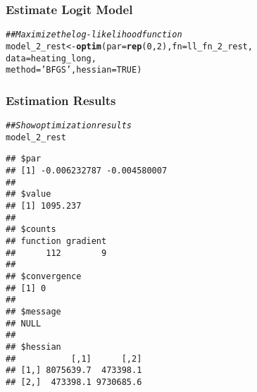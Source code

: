 \documentclass{beamer}\usepackage[]{graphicx}\usepackage[]{color}
\makeatletter
\newcommand{\hlnum}[1]{\textcolor[rgb]{0.686,0.059,0.569}{#1}}%
\newcommand{\hlstr}[1]{\textcolor[rgb]{0.192,0.494,0.8}{#1}}%
\newcommand{\hlcom}[1]{\textcolor[rgb]{0.678,0.584,0.686}{\textit{#1}}}%
\newcommand{\hlstd}[1]{\textcolor[rgb]{0.345,0.345,0.345}{#1}}%
\newcommand{\hlkwb}[1]{\textcolor[rgb]{0.69,0.353,0.396}{#1}}%
\newcommand{\hlkwc}[1]{\textcolor[rgb]{0.333,0.667,0.333}{#1}}%
\newcommand{\hlkwd}[1]{\textcolor[rgb]{0.737,0.353,0.396}{\textbf{#1}}}%
\newenvironment{kframe}{%
 \def\at@end@of@kframe{}%
 \ifinner\ifhmode%
  \def\at@end@of@kframe{\end{minipage}}%
  \begin{minipage}{\columnwidth}%
 \fi\fi%
 \def\FrameCommand##1{\hskip\@totalleftmargin \hskip-\fboxsep
 \colorbox{shadecolor}{##1}\hskip-\fboxsep
     \hskip-\linewidth \hskip-\@totalleftmargin \hskip\columnwidth}%
 \MakeFramed {\advance\hsize-\width
   \@totalleftmargin\z@ \linewidth\hsize
   \@setminipage}}%
 {\par\unskip\endMakeFramed%
 \at@end@of@kframe}
\newenvironment{knitrout}{}{} %
\makeatother
\begin{document}
\begin{frame}[fragile]\frametitle{Estimate Logit Model}
\begin{knitrout}\footnotesize
{}\color{fgcolor}\begin{kframe}
\begin{alltt}
\hlcom{## Maximize the log-likelihood function}
\hlstd{model_2_rest} \hlkwb{<-} \hlkwd{optim}\hlstd{(}\hlkwc{par} \hlstd{=} \hlkwd{rep}\hlstd{(}\hlnum{0}\hlstd{,} \hlnum{2}\hlstd{),} \hlkwc{fn} \hlstd{= ll_fn_2_rest,}
                      \hlkwc{data} \hlstd{= heating_long,}
                      \hlkwc{method} \hlstd{=} \hlstr{'BFGS'}\hlstd{,} \hlkwc{hessian} \hlstd{=} \hlnum{TRUE}\hlstd{)}
\end{alltt}
\end{kframe}
\end{knitrout}
\end{frame}

\begin{frame}[fragile]\frametitle{Estimation Results}
    \vspace{1ex}
\begin{knitrout}\scriptsize
{}\color{fgcolor}\begin{kframe}
\begin{alltt}
\hlcom{## Show optimization results}
\hlstd{model_2_rest}
\end{alltt}
\begin{verbatim}
## $par
## [1] -0.006232787 -0.004580007
## 
## $value
## [1] 1095.237
## 
## $counts
## function gradient 
##      112        9 
## 
## $convergence
## [1] 0
## 
## $message
## NULL
## 
## $hessian
##           [,1]      [,2]
## [1,] 8075639.7  473398.1
## [2,]  473398.1 9730685.6
\end{verbatim}
\end{kframe}
\end{knitrout}
\end{frame}
\end{document}
